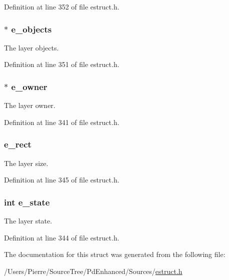 Definition at line 352 of file estruct.\-h.

\hypertarget{struct__elayer_a6f0b120b9e9be17af36ba96a368ffccb}{
\subsubsection[{e\-\_\-objects}]{$\ast$ e\-\_\-objects}}\label{struct__elayer_a6f0b120b9e9be17af36ba96a368ffccb}
The layer objects. 

Definition at line 351 of file estruct.\-h.

\hypertarget{struct__elayer_a2a35e154dc0053b0c8078d322ee1b5e3}{
\subsubsection[{e\-\_\-owner}]{$\ast$ e\-\_\-owner}}\label{struct__elayer_a2a35e154dc0053b0c8078d322ee1b5e3}
The layer owner. 

Definition at line 341 of file estruct.\-h.

\hypertarget{struct__elayer_aaef55281ce06e8d04077acd1e73e484e}{
\subsubsection[{e\-\_\-rect}]{ e\-\_\-rect}}\label{struct__elayer_aaef55281ce06e8d04077acd1e73e484e}
The layer size. 

Definition at line 345 of file estruct.\-h.

\hypertarget{struct__elayer_a6ebb09ffbaedff41ff95d74f7ebdb71b}{
\subsubsection[{e\-\_\-state}]{\setlength{\rightskip}{0pt plus 5cm}int e\-\_\-state}}\label{struct__elayer_a6ebb09ffbaedff41ff95d74f7ebdb71b}
The layer state. 

Definition at line 344 of file estruct.\-h.



The documentation for this struct was generated from the following file\-:\begin{DoxyCompactItemize}
\item 
/\-Users/\-Pierre/\-Source\-Tree/\-Pd\-Enhanced/\-Sources/\hyperlink{estruct_8h}{estruct.\-h}\end{DoxyCompactItemize}

